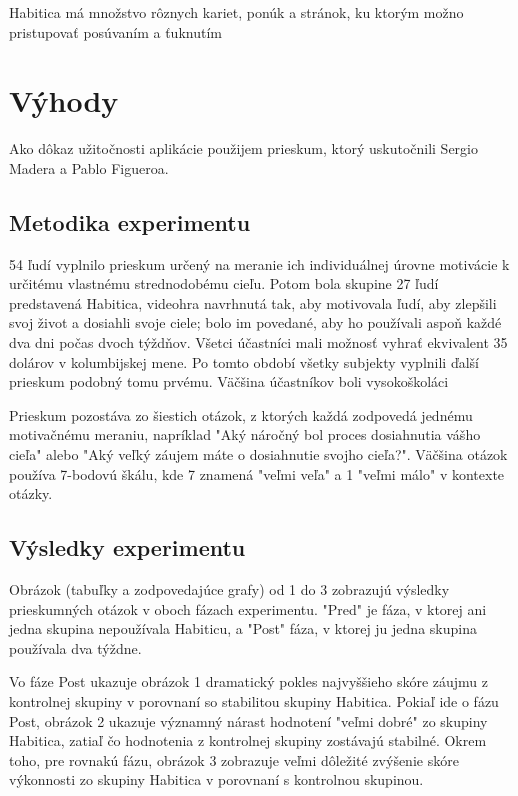 \documentclass[10pt,twoside,slovak,a4paper]{article}
\begin{document}
Habitica má množstvo rôznych kariet, ponúk a stránok, ku ktorým možno pristupovať posúvaním a ťuknutím

\section{Výhody} \label{benefits}
Ako dôkaz užitočnosti aplikácie použijem prieskum, ktorý uskutočnili Sergio Madera a Pablo Figueroa.\cite{StudyOnPotentialOfVideogames}

\subsection{Metodika experimentu} \label{benefits:methodology}
54 ľudí vyplnilo prieskum určený na meranie ich individuálnej úrovne motivácie k určitému vlastnému strednodobému cieľu. 
Potom bola skupine 27 ľudí predstavená Habitica, videohra navrhnutá tak, aby motivovala ľudí, aby zlepšili svoj život a 
dosiahli svoje ciele; bolo im povedané, aby ho používali aspoň každé dva dni počas dvoch týždňov. 
Všetci účastníci mali možnosť vyhrať ekvivalent 35 dolárov v kolumbijskej mene. Po tomto období 
všetky subjekty vyplnili ďalší prieskum podobný tomu prvému. Väčšina účastníkov boli vysokoškoláci\cite{StudyOnPotentialOfVideogames}

Prieskum pozostáva zo šiestich otázok, z ktorých každá zodpovedá jednému motivačnému meraniu, napríklad 
"Aký náročný bol proces dosiahnutia vášho cieľa" alebo "Aký veľký záujem máte o dosiahnutie svojho cieľa?". 
Väčšina otázok používa 7-bodovú škálu, kde 7 znamená "veľmi veľa" a 1 "veľmi málo" v kontexte otázky.\cite{StudyOnPotentialOfVideogames}

\subsection{Výsledky experimentu} \label{benefits:results}
Obrázok (tabuľky a zodpovedajúce grafy) od 1 do 3 zobrazujú výsledky prieskumných otázok v oboch fázach experimentu. 
"Pred" je fáza, v ktorej ani jedna skupina nepoužívala Habiticu, a 
"Post" fáza, v ktorej ju jedna skupina používala dva týždne.

Vo fáze Post ukazuje obrázok 1 dramatický pokles najvyššieho skóre 
záujmu z kontrolnej skupiny v porovnaní so stabilitou skupiny Habitica.
Pokiaľ ide o fázu Post, obrázok 2 ukazuje významný nárast hodnotení "veľmi dobré" 
zo skupiny Habitica, zatiaľ čo hodnotenia z kontrolnej skupiny zostávajú stabilné. 
Okrem toho, pre rovnakú fázu, obrázok 3 zobrazuje veľmi dôležité zvýšenie skóre 
výkonnosti zo skupiny Habitica v porovnaní s kontrolnou skupinou.\cite{StudyOnPotentialOfVideogames}
\end{document}
